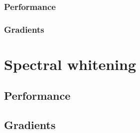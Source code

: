 \subsubsection{Performance}
\subsubsection{Gradients}

\section{Spectral whitening}\label{sec:spectral-whitening}

\subsection{Performance}\label{subsec:pw-performance}

\subsection{Gradients}\label{subsec:pw-gradients2}
